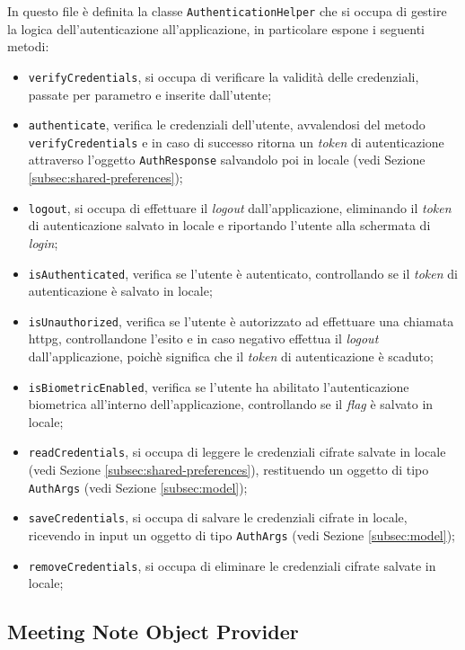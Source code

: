 In questo file è definita la classe \lstinline{AuthenticationHelper} che si occupa di gestire la logica dell'autenticazione all'applicazione, in particolare espone i seguenti metodi:
\begin{itemize}
    \item \lstinline{verifyCredentials}, si occupa di verificare la validità delle credenziali, passate per parametro e inserite dall'utente;
    \item \lstinline{authenticate}, verifica le credenziali dell'utente, avvalendosi del metodo \lstinline{verifyCredentials} e in caso di successo ritorna un \emph{token} di autenticazione attraverso l'oggetto \lstinline{AuthResponse} salvandolo poi in locale (vedi Sezione \ref{subsec:shared-preferences});
    \item \lstinline{logout}, si occupa di effettuare il \emph{logout} dall'applicazione, eliminando il \emph{token} di autenticazione salvato in locale e riportando l'utente alla schermata di \emph{login};
    \item \lstinline{isAuthenticated}, verifica se l'utente è autenticato, controllando se il \emph{token} di autenticazione è salvato in locale;
    \item \lstinline{isUnauthorized}, verifica se l'utente è autorizzato ad effettuare una chiamata \gls{httpg}\glsoccur, controllandone l'esito e in caso negativo effettua il \emph{logout} dall'applicazione, poichè significa che il \emph{token} di autenticazione è scaduto;
    \item \lstinline{isBiometricEnabled}, verifica se l'utente ha abilitato l'autenticazione biometrica all'interno dell'applicazione, controllando se il \emph{flag} è salvato in locale;
    \item \lstinline{readCredentials}, si occupa di leggere le credenziali cifrate salvate in locale (vedi Sezione \ref{subsec:shared-preferences}), restituendo un oggetto di tipo \lstinline{AuthArgs} (vedi Sezione \ref{subsec:model});
    \item \lstinline{saveCredentials}, si occupa di salvare le credenziali cifrate in locale, ricevendo in input un oggetto di tipo \lstinline{AuthArgs} (vedi Sezione \ref{subsec:model});
    \item \lstinline{removeCredentials}, si occupa di eliminare le credenziali cifrate salvate in locale;
\end{itemize}

\subsection{Meeting Note Object Provider}
\label{subsec:meeting-note-object-provider}

